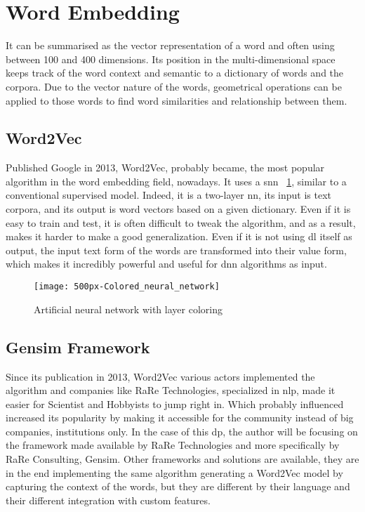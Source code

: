 \section{Word Embedding}
\label{stoa:word-embedding}
It can be summarised as the vector representation of a word and often using between 100 and 400 dimensions. Its position in the multi-dimensional space keeps track of the word context and semantic to a dictionary of words and the corpora. Due to the vector nature of the words, geometrical operations can be applied to those words to find word similarities and relationship between them. 


\subsection{Word2Vec}
\label{stoa:word2vec}
Published Google in 2013, Word2Vec\cite{article:word2vec}, probably became, the most popular algorithm in the word embedding field, nowadays. It uses a \gls{snn} ~\ref{fig:wikipedia_colored_neural_network_img}, similar to a conventional supervised model. Indeed, it is a two-layer \gls{nn}, its input is text corpora, and its output is word vectors based on a given dictionary. Even if it is easy to train and test, it is often difficult to tweak the algorithm, and as a result, makes it harder to make a good generalization. Even if it is not using \gls{dl} itself as output, the input text form of the words are transformed into their value form, which makes it incredibly powerful and useful for \gls{dnn} algorithms as input.

\begin{figure}[ht!]
    \centering
    \texttt{[image: 500px-Colored\_neural\_network]}
    \caption{
       Artificial neural network with layer coloring \cite{wikipedia:colored_neural_network_img}
    }
    \label{fig:wikipedia_colored_neural_network_img}
\end{figure}


\subsection{Gensim Framework}
\label{stoa:gensim}
Since its publication in 2013, Word2Vec\cite{article:word2vec} various actors implemented the algorithm and companies like RaRe Technologies\cite{company:rare-technologies}, specialized in \gls{nlp}, made it easier for Scientist and Hobbyists to jump right in. Which probably influenced increased its popularity by making it accessible for the community instead of big companies, institutions only. In the case of this \gls{dp}, the author will be focusing on the framework made available by RaRe Technologies and more specifically by RaRe Consulting\cite{company:rare-consulting}, Gensim\cite{article:rehurek_lrec}. Other frameworks and solutions are available, they are in the end implementing the same algorithm generating a Word2Vec model by capturing the context of the words, but they are different by their language and their different integration with custom features.\\

